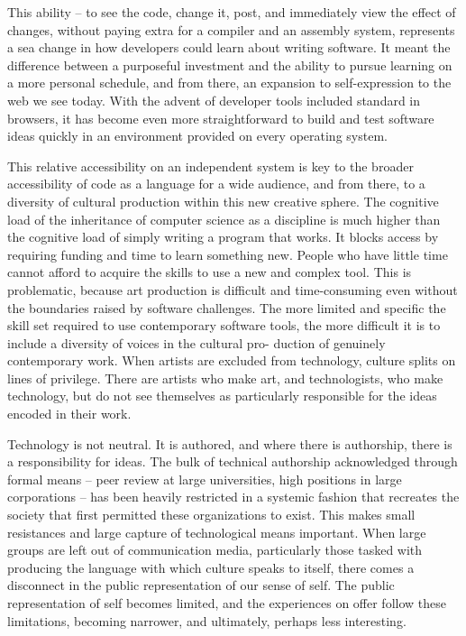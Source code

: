 This ability – to see the code, change it, post, and immediately view the effect of changes, without paying extra for a compiler and an assembly system, represents a sea change in how developers could learn about writing software. It meant the difference between a purposeful investment and the ability to pursue learning on a more personal schedule, and from there, an expansion to self-expression to the web we see today. With the advent of developer tools included standard in browsers, it has become even more straightforward to build and test software ideas quickly in an environment provided on every operating system. 

This relative accessibility on an independent system is key to the broader accessibility of code as a language for a wide audience, and from there, to a diversity of cultural production within this new creative sphere. The cognitive load of the inheritance of computer science as a discipline is much higher than the cognitive load of simply writing a program that works. It blocks access by requiring funding and time to learn something new. People who have little time cannot afford to acquire the skills to use a new and complex tool. This is problematic, because art production is difficult and time-consuming even without the boundaries raised by software challenges. The more limited and specific the skill set required to use contemporary software tools, the more difficult it is to include a diversity of voices in the cultural pro- duction of genuinely contemporary work. When artists are excluded from technology, culture splits on lines of privilege. There are artists who make art, and technologists, who make technology, but do not see themselves as particularly responsible for the ideas encoded in their work. 

Technology is not neutral. It is authored, and where there is authorship, there is a responsibility for ideas. The bulk of technical authorship acknowledged through formal means – peer review at large universities, high positions in large corporations – has been heavily restricted in a systemic fashion that recreates the society that first permitted these organizations to exist. This makes small resistances and large capture of technological means important. When large groups are left out of communication media, particularly those tasked with producing the language with which culture speaks to itself, there comes a disconnect in the public representation of our sense of self. The public representation of self becomes limited, and the experiences on offer follow these limitations, becoming narrower, and ultimately, perhaps less interesting.

